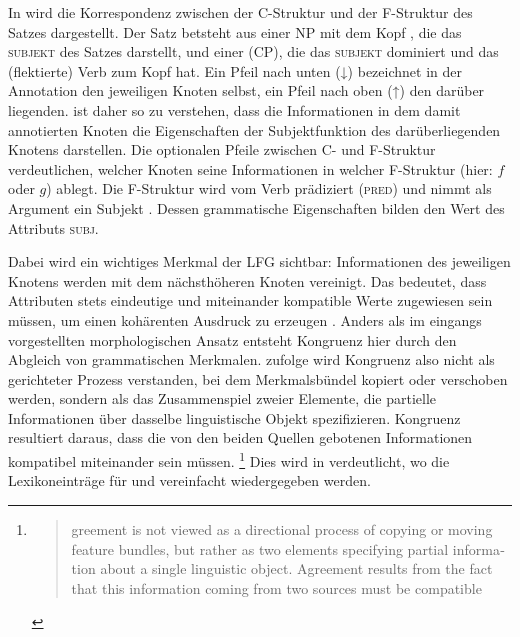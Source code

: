 In  wird die Korrespondenz zwischen der C-Struktur und der
F-Struktur des Satzes  dargestellt. Der Satz betsteht aus einer
NP mit dem Kopf , die das \textsc{subjekt} des Satzes darstellt, und
einer  (CP), die das \textsc{subjekt} dominiert und
das (flektierte) Verb  zum Kopf hat. Ein Pfeil nach unten (↓)
bezeichnet in der Annotation den jeweiligen Knoten selbst, ein Pfeil nach oben
(↑) den darüber liegenden.  ist daher so zu verstehen, dass die
Informationen in dem damit annotierten Knoten die Eigenschaften der
Subjekt\-funk\-tion des darüberliegenden Knotens darstellen. Die optionalen
Pfeile zwischen C- und F-Struktur verdeutlichen, welcher Knoten seine
Informationen in welcher F-Struktur (hier: $f$ oder $g$) ablegt. Die F-Struktur
wird vom Verb  prädiziert (\textsc{pred}) und nimmt als Argument ein
Subjekt . Dessen grammatische Eigenschaften bilden den Wert des
Attributs \textsc{subj}.

Dabei wird ein wichtiges Merkmal der LFG sichtbar: Informationen des jeweiligen
Knotens werden mit dem nächsthöheren Knoten vereinigt. Das bedeutet, dass
Attributen stets eindeutige und miteinander kompatible Werte zugewiesen sein
müssen, um einen kohärenten Ausdruck zu erzeugen
\autocite[vgl.][43--54]{bresnanetal2016}. Anders als im eingangs vorgestellten
morphologischen Ansatz entsteht Kongruenz hier durch den Abgleich von
grammatischen Merkmalen. \citet[7]{wechslerzlatic2003} zufolge wird Kongruenz
also nicht als gerichteter Prozess verstanden, bei dem Merkmalsbündel kopiert
oder verschoben werden, sondern als das Zusammenspiel zweier Elemente, die
partielle Informationen über dasselbe linguistische Objekt spezifizieren.
Kongruenz resultiert daraus, dass die von den beiden Quellen gebotenen
Informationen kompatibel miteinander sein müssen.%
%
	\footnote{\foreignblockcquote{english}[7]{wechslerzlatic2003}{%
		greement is not viewed as a directional process of copying
		or moving feature bundles, but rather as two elements specifying
		partial information about a single linguistic object. Agreement results
		from the fact that this information coming from two sources must be
		compatible}.
	}
%
Dies wird in  verdeutlicht, wo die Lexikoneinträge für
 und  vereinfacht wiedergegeben werden.

